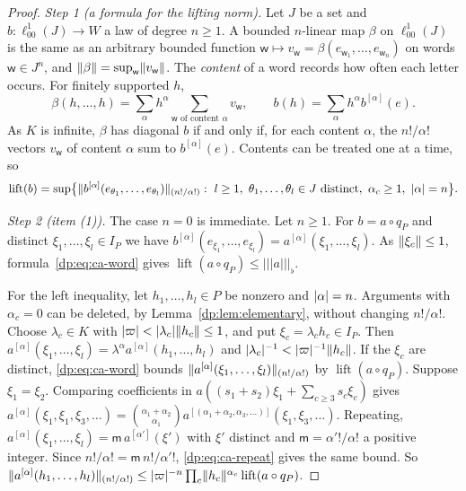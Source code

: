 \begin{proof}
\emph{Step 1 (a formula for the lifting norm).} Let $J$ be a set and $b\colon\ell^1_{00}(J)\to W$ a law of degree $n\ge1$. A bounded $n$-linear map $\beta$ on $\ell^1_{00}(J)$ is the same as an arbitrary bounded function $\mathsf w\mapsto v_{\mathsf w}=\beta(e_{\mathsf w_1},\dots,e_{\mathsf w_n})$ on words $\mathsf w\in J^n$, and $\lVert \beta\rVert=\sup_{\mathsf w}\lVert v_{\mathsf w}\rVert$. The \emph{content} of a word records how often each letter occurs. For finitely supported $h$,
\[
 \beta(h,\dots,h)=\sum_\alpha h^\alpha\sum_{\mathsf w\text{ of content }\alpha}v_{\mathsf w},\qquad b(h)=\sum_\alpha h^\alpha b^{[\alpha]}(e).
\]
As $K$ is infinite, $\beta$ has diagonal $b$ if and only if, for each content $\alpha$, the $n!/\alpha!$ vectors $v_{\mathsf w}$ of content $\alpha$ sum to $b^{[\alpha]}(e)$. Contents can be treated one at a time, so
\begin{equation}\label{dp:eq:ca-word}
 \operatorname{lift}(b)=\sup\bigl\{\norm{b^{[\alpha]}(e_{\theta_1},\dots,e_{\theta_l})}_{(n!/\alpha!)}:\ l\ge1,\ \theta_1,\dots,\theta_l\in J\text{ distinct},\ \alpha_c\ge1,\ \abs\alpha=n\bigr\}.
\end{equation}

\emph{Step 2 (item (1)).} The case $n=0$ is immediate. Let $n\ge1$. For $b=a\circ q_P$ and distinct $\xi_1,\dots,\xi_l\in I_P$ we have $b^{[\alpha]}(e_{\xi_1},\dots,e_{\xi_l})=a^{[\alpha]}(\xi_1,\dots,\xi_l)$. As $\lVert \xi_c\rVert\le1$, formula~\eqref{dp:eq:ca-word} gives $\operatorname{lift}(a\circ q_P)\le\lvert\!\lvert\!\lvert a\rvert\!\rvert\!\rvert_\flat$.

For the left inequality, let $h_1,\dots,h_l\in P$ be nonzero and $\lvert \alpha\rvert=n$. Arguments with $\alpha_c=0$ can be deleted, by Lemma~\ref{dp:lem:elementary}, without changing $n!/\alpha!$. Choose $\lambda_c\in K$ with $\lvert \varpi\rvert<\lvert \lambda_c\rvert\lVert h_c\rVert\le1$, and put $\xi_c=\lambda_ch_c\in I_P$. Then $a^{[\alpha]}(\xi_1,\dots,\xi_l)=\lambda^\alpha a^{[\alpha]}(h_1,\dots,h_l)$ and $\lvert \lambda_c\rvert^{-1}<\lvert \varpi\rvert^{-1}\lVert h_c\rVert$. If the $\xi_c$ are distinct, \eqref{dp:eq:ca-word} bounds $\lVert a^{[\alpha]}(\xi_1,\dots,\xi_l)\rVert_{(n!/\alpha!)}$ by $\operatorname{lift}(a\circ q_P)$. Suppose $\xi_1=\xi_2$. Comparing coefficients in $a((s_1+s_2)\xi_1+\sum_{c\ge3}s_c\xi_c)$ gives $a^{[\alpha]}(\xi_1,\xi_1,\xi_3,\dots)=\binom{\alpha_1+\alpha_2}{\alpha_1}a^{[(\alpha_1+\alpha_2,\alpha_3,\dots)]}(\xi_1,\xi_3,\dots)$. Repeating, $a^{[\alpha]}(\xi_1,\dots,\xi_l)=\mathsf m\,a^{[\alpha']}(\xi')$ with $\xi'$ distinct and $\mathsf m=\alpha'!/\alpha!$ a positive integer. Since $n!/\alpha!=\mathsf m\,n!/\alpha'!$, \eqref{dp:eq:ca-repeat} gives the same bound. So $\lVert a^{[\alpha]}(h_1,\dots,h_l)\rVert_{(n!/\alpha!)}\le\lvert \varpi\rvert^{-n}\prod_c\lVert h_c\rVert^{\alpha_c}\operatorname{lift}(a\circ q_P)$.


\end{proof}
